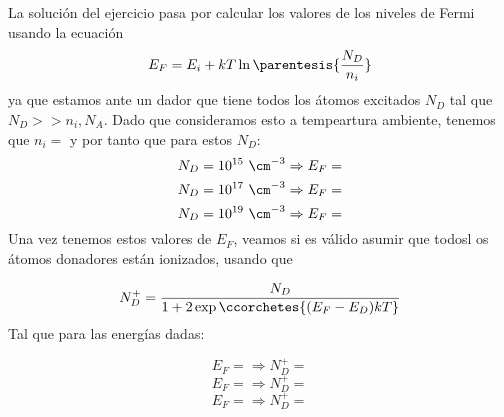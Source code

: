 	La solución del ejercicio pasa por calcular los valores de los niveles de Fermi usando la ecuación
	\begin{equation}
		E_F = E_i + kT \ln \parentesis{\frac{N_D}{n_i}}
	\end{equation}
	ya que estamos ante un dador que tiene todos los átomos excitados $N_D$ tal que $N_D>>n_i,N_A$. Dado que consideramos esto a tempeartura ambiente, tenemos que $n_i=$ y por tanto que para estos $N_D$:
	\begin{equation}
		N_D=10^{15} \ \cm^{-3} \Rightarrow E_F =
	\end{equation}
	\begin{equation}
		N_D=10^{17} \ \cm^{-3} \Rightarrow E_F =
	\end{equation}
	\begin{equation}
		N_D=10^{19} \ \cm^{-3} \Rightarrow E_F =
	\end{equation}
	Una vez tenemos estos valores de $E_F$, veamos si es válido asumir que todosl os átomos donadores están ionizados, usando que

	\begin{equation}
		N_D^+ = \frac{N_D}{1+2\exp\ccorchetes{(E_F-E_D)kT}}
	\end{equation}
	Tal que para las energías dadas:

	\begin{equation}
		E_F=  \Rightarrow N_D^+ =
	\end{equation}
	\begin{equation}
		E_F = \Rightarrow N_D^+ =
	\end{equation}
	\begin{equation}
		E_F = \Rightarrow N_D^+ =
	\end{equation}
